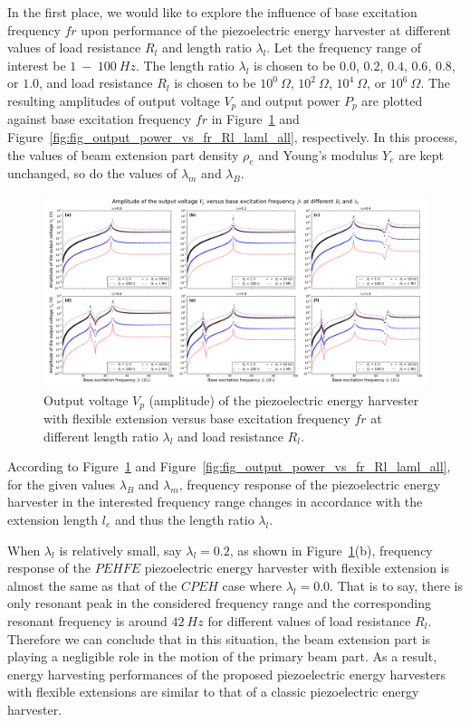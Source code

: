 \documentclass{elsarticle}
\begin{document}
In the first place, we would like to explore the influence of base excitation frequency $fr$ upon performance of the piezoelectric energy harvester at different values of load resistance $R_l$ and length ratio $\lambda_l$. Let the frequency range of interest be $1\ -\ 100\ Hz$. The length ratio $\lambda_l$ is chosen to be $0.0$, $0.2$, $0.4$, $0.6$, $0.8$, or $1.0$, and load resistance $R_l$ is chosen to be $10^0\ \Omega$, $10^2\ \Omega$, $10^4\ \Omega$, or $10^6\ \Omega$. The resulting amplitudes of output voltage $V_p$ and output power $P_p$ are plotted against base excitation frequency $fr$ in Figure~\ref{fig:fig_output_voltage_vs_fr_Rl_laml_all} and Figure~\ref{fig:fig_output_power_vs_fr_Rl_laml_all}, respectively. In this process, the values of beam extension part density $\rho_e$ and Young's modulus $Y_e$ are kept unchanged, so do the values of $\lambda_m$ and $\lambda_B$.

\begin{figure}[!htbp]
    \centering
    \includegraphics[width=\textwidth]{./fig_output_voltage_vs_fr_Rl_laml_all}
    \caption{Output voltage $V_p$ (amplitude) of the piezoelectric energy harvester with flexible extension versus base excitation frequency $fr$ at different length ratio $\lambda_l$ and load resistance $R_l$. }
    \label{fig:fig_output_voltage_vs_fr_Rl_laml_all}
\end{figure}

According to Figure~\ref{fig:fig_output_voltage_vs_fr_Rl_laml_all} and Figure~\ref{fig:fig_output_power_vs_fr_Rl_laml_all}, for the given values $\lambda_B$ and $\lambda_m$, frequency response of the piezoelectric energy harvester in the interested frequency range changes in accordance with the extension length $l_e$ and thus the length ratio $\lambda_l$. 

When $\lambda_l$ is relatively small, say $\lambda_l = 0.2$, as shown in Figure~\ref{fig:fig_output_voltage_vs_fr_Rl_laml_all}(b), frequency response of the $PEHFE$ piezoelectric energy harvester with flexible extension is almost the same as that of the $CPEH$ case where $\lambda_l = 0.0$. That is to say, there is only resonant peak in the considered frequency range and the corresponding resonant frequency is around $42\ Hz$ for different values of load resistance $R_l$. Therefore we can conclude that in this situation, the beam extension part is playing a negligible role in the motion of the primary beam part. As a result, energy harvesting performances of the proposed piezoelectric energy harvesters with flexible extensions are similar to that of a classic piezoelectric energy harvester. 
\end{document}
